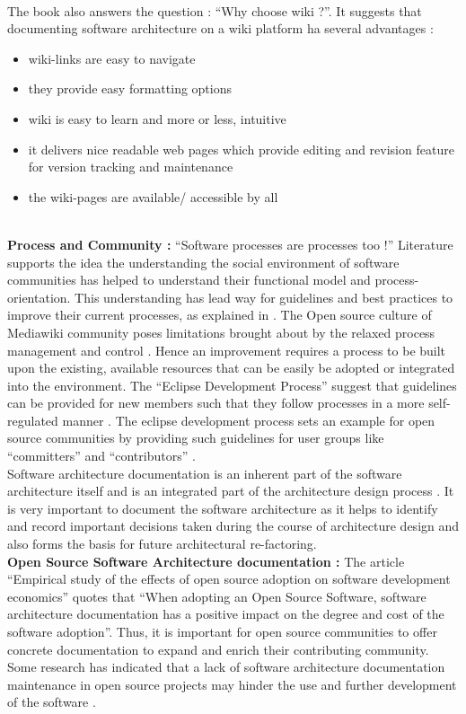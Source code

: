 \\\indent The book also answers the question : \enquote{Why choose wiki ?}. It suggests that documenting software architecture on a wiki platform ha several advantages :
\begin{itemize}
\item wiki-links are easy to navigate
\item they provide easy formatting options 
\item wiki is easy to learn and more or less, intuitive
\item it delivers nice readable web pages which provide editing and revision feature for version tracking and maintenance
\item the wiki-pages are available/ accessible by all
\end{itemize}
\indent
\\\indent \textbf{Process and Community : } \enquote{Software processes are processes too !} \cite{Fuggeffa1988}Literature supports the idea the understanding the social environment of software communities has helped to understand their functional model and process-orientation. This understanding has lead way for guidelines and best practices to improve their current processes, as explained in \cite{bab2009}. The Open source culture of Mediawiki community poses limitations brought about by the relaxed process management and control \cite{6923128}. Hence an improvement requires a process to be built upon the existing, available resources that can be easily be adopted or integrated into the environment. The \enquote{Eclipse Development Process} suggest that guidelines can be provided for new members such that they follow processes in a more self-regulated manner \cite{eclipse2013}. The eclipse development process sets an example for open source communities by providing such guidelines for user groups like \enquote{committers} and \enquote{contributors} .
\\\indent Software architecture documentation is an inherent part of the software architecture itself and is an integrated part of the architecture design process \cite{Shahin2009}. It is very important to document the software architecture as it helps to identify and record important decisions taken during the course of architecture design and also forms the basis for future architectural re-factoring.
\newline
\\\indent \textbf{Open Source Software Architecture documentation : } The article \enquote{Empirical study of the effects of open source adoption on software development economics} \cite{Ajila2007} quotes that \enquote{When adopting an Open Source Software, software architecture documentation has a positive impact on the degree and cost of the software adoption}. Thus, it is important for open source communities to offer concrete documentation to expand and enrich their contributing community. Some research has indicated that a lack of software architecture documentation maintenance in open source projects may hinder the use and further development of the software \cite{michlmayr:quality_problems}.
